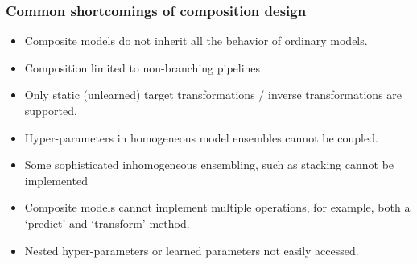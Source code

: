 \documentclass[t]{beamer}
\newcommand\df{\bf\color{Maroon}}
\begin{document}
\begin{frame}[plain]
  \frametitle{Common shortcomings of composition design}
\begin{itemize}
\item Composite models do not inherit all the behavior of ordinary
  models.\pause
\item Composition limited to non-branching pipelines\pause
\item Only static (unlearned) target transformations / inverse
  transformations are supported.\label{four}\pause
\item Hyper-parameters in homogeneous model ensembles cannot be coupled.\pause
\item Some sophisticated inhomogeneous ensembling, such as stacking
  cannot be implemented\pause
\item Composite models cannot implement multiple operations, for example,
  both a `predict' and `transform' method.\pause
\item Nested hyper-parameters or learned parameters not easily accessed.
\end{itemize}
\end{frame}
\end{document}
